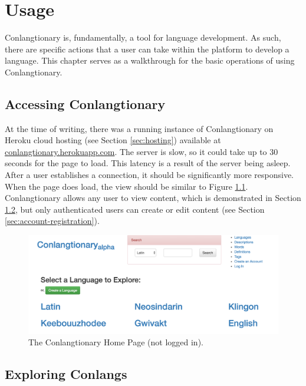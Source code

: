\chapter{Usage}
\label{chap:usage}

Conlangtionary is, fundamentally, a tool for language development. As such, there are specific actions that a user can take within the platform to develop a language. This chapter serves as a walkthrough for the basic operations of using Conlangtionary.

\section{Accessing Conlangtionary}
\label{sec:accessing-conlangtionary}

At the time of writing, there was a running instance of Conlangtionary on Heroku cloud hosting (see Section \ref{sec:hosting}) available at \url{conlangtionary.herokuapp.com}. The server is slow, so it could take up to 30 seconds for the page to load. This latency is a result of the server being asleep. After a user establishes a connection, it should be significantly more responsive. When the page does load, the view should be similar to Figure \ref{fig:home-not-logged-in}. Conlangtionary allows any user to view content, which is demonstrated in Section \ref{sec:exploring-conlangs}, but only authenticated users can create or edit content (see Section \ref{sec:account-registration}).

\begin{figure}[h]
\includegraphics[width=\textwidth]{figures/home-not-logged-in}
\caption{The Conlangtionary Home Page (not logged in).}
\centering
\label{fig:home-not-logged-in}
\end{figure}

\section{Exploring Conlangs}
\label{sec:exploring-conlangs}

